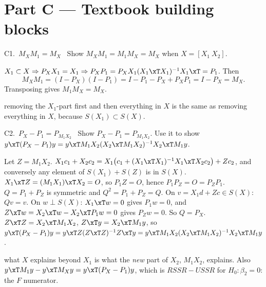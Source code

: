 
\section{Part C --- Textbook building blocks}

\begin{qbox}{C1.\ $M_{X}M_{1} = M_{X}$}{\likely\ }
Show $M_{X}M_{1} = M_{1}M_{X} = M_{X}$ when $X = [X_{1}\ X_{2}]$.
\end{qbox}
\begin{solbox}
$X_{1}\subset X\Rightarrow P_{X}X_{1}=X_{1}\Rightarrow P_{X}P_{1}=P_{X}X_{1}(X_{1}\xT X_{1})^{-1}X_{1}\xT=P_{1}$. Then
\[
  M_{X}M_{1}=(I-P_{X})(I-P_{1})=I-P_{1}-P_{X}+P_{X}P_{1}=I-P_{X}=M_{X}.
\]
Transposing gives $M_{1}M_{X}=M_{X}$.
\begin{why}\Why removing the $X_{1}$-part first and then everything in $X$ is the same as removing everything in $X$,
because $S(X_{1})\subset S(X)$.\end{why}
\end{solbox}

\begin{qbox}{C2.\ $P_{X} - P_{1} = P_{M_{1}X_{2}}$}{\must\ }
Show $P_{X} - P_{1} = P_{M_{1}X_{2}}$. Use it to show
$y\xT(P_{X} - P_{1})y = y\xT M_{1}X_{2}(X_{2}\xT M_{1}X_{2})^{-1}X_{2}\xT M_{1}y$.
\end{qbox}
\begin{solbox}
Let $Z=M_{1}X_{2}$.
 $X_{1}c_{1}+X_{2}c_{2}=X_{1}\big(c_{1}+(X_{1}\xT X_{1})^{-1}X_{1}\xT X_{2}c_{2}\big)+Zc_{2}$,
and conversely any element of $S(X_{1})+S(Z)$ is in $S(X)$.
 $X_{1}\xT Z=(M_{1}X_{1})\xT X_{2}=O$, so $P_{1}Z=O$, hence $P_{1}P_{Z}=O=P_{Z}P_{1}$.
 $Q=P_{1}+P_{Z}$ is symmetric and $Q^{2}=P_{1}+P_{Z}=Q$.
On $v=X_{1}d+Zc\in S(X)$: $Qv=v$. On $w\perp S(X)$: $X_{1}\xT w=0$ gives $P_{1}w=0$, and
$Z\xT w=X_{2}\xT w-X_{2}\xT P_{1}w=0$ gives $P_{Z}w=0$. So $Q=P_{X}$.
 $Z\xT Z=X_{2}\xT M_{1}X_{2}$, $Z\xT y=X_{2}\xT M_{1}y$, so
$y\xT(P_{X}-P_{1})y=y\xT Z(Z\xT Z)^{-1}Z\xT y=y\xT M_{1}X_{2}(X_{2}\xT M_{1}X_{2})^{-1}X_{2}\xT M_{1}y$.
\begin{why}\Why what $X$ explains beyond $X_{1}$ is what the \emph{new} part of $X_{2}$, $M_{1}X_{2}$, explains. Also
$y\xT M_{1}y-y\xT M_{X}y=y\xT(P_{X}-P_{1})y$, which is $RSSR-USSR$ for $H_{0}:\beta_{2}=0$: the $F$ numerator.\end{why}
\end{solbox}

